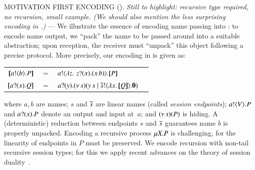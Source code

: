 MOTIVATION FIRST ENCODING (). \emph{Still to highlight: recursive type required, no recursion, small example.
(We should also mention the less surprising encoding in .) }
--- We illustrate the essence of encoding name passing into \HO: 
to encode name output, we ``pack''
the name to be passed around into a suitable abstraction; 
upon reception, the receiver must ``unpack'' this object following a precise protocol.
More precisely, our encoding 
in \HO is given as:
\begin{center}
\begin{tabular}{rcll}
  $[\!\![a ! \langle b \rangle . P]\!\!]$	&$=$&	$a ! \langle  \lambda z.\,\,z ? (x) . (x\, {b})  \rangle . [\!\![P]\!\!]$ \\
  $[\!\![a ? (x) . Q]\!\!]$	&$=$&	$a ? (y) . (\nu\, s)(y\, {s} \;|\; \overline{s} ! \langle \lambda x.\,[\!\![Q]\!\!] \rangle . \mathbf{0})$
\end{tabular}
\end{center}
\noi where $a,b$ are names; $s$ and $\overline{s}$ are 
linear names (called \emph{session endpoints});
$a ! \langle V \rangle . P$ and 
$a ? (x) . P$ denote an output and input at~$a$;   
and $(\nu\, s)(P)$ is hiding. 
A (deterministic) reduction between   endpoints 
$s$ and $\overline{s}$ guarantees name $b$ is properly unpacked.
Encoding a recursive process $\mu X. P$ is  challenging, for 
the linearity of endpoints in $P$ must be preserved.
We encode recursion with non-tail recursive session types; for this 
we apply recent advances on the theory of session duality~\cite{TGC14,DBLP:journals/corr/abs-1202-2086}.

